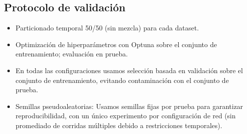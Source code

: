 \subsection{Protocolo de validación}
\begin{itemize}
    \item Particionado temporal 50/50 (sin mezcla) para cada dataset.
    \item Optimización de hiperparámetros con Optuna sobre el conjunto de entrenamiento; evaluación en prueba. 
    \item En todas las configuraciones usamos selección basada en validación sobre el conjunto de entrenamiento, evitando contaminación con el conjunto de prueba.
    \item Semillas pseudoaleatorias: Usamos semillas fijas por prueba para garantizar reproducibilidad, con un único experimento por configuración de red (sin promediado de corridas múltiples debido a restricciones temporales).
\end{itemize}
